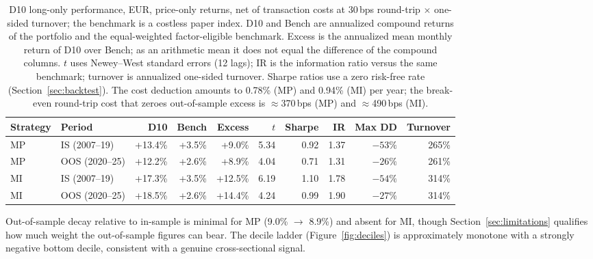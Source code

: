 \documentclass[11pt,a4paper]{article}
\begin{document}
\begin{table}[t]
\centering
\small
\setlength{\tabcolsep}{4pt}
\begin{tabular}{llrrrrrrrr}
\toprule
Strategy & Period & D10 & Bench & Excess & $t$ & Sharpe & IR & Max DD & Turnover \\
\midrule
MP & IS  (2007--19) & +13.4\% & +3.5\% & +9.0\%  & 5.34 & 0.92 & 1.37 & $-53\%$ & 265\% \\
MP & OOS (2020--25) & +12.2\% & +2.6\% & +8.9\%  & 4.04 & 0.71 & 1.31 & $-26\%$ & 261\% \\
MI & IS  (2007--19) & +17.3\% & +3.5\% & +12.5\% & 6.19 & 1.10 & 1.78 & $-54\%$ & 314\% \\
MI & OOS (2020--25) & +18.5\% & +2.6\% & +14.4\% & 4.24 & 0.99 & 1.90 & $-27\%$ & 314\% \\
\bottomrule
\end{tabular}
\caption{D10 long-only performance, EUR, price-only returns, net of
transaction costs at 30\,bps round-trip $\times$ one-sided turnover; the
benchmark is a costless paper index.
D10 and Bench are annualized compound returns of the portfolio and the
equal-weighted factor-eligible benchmark. Excess is the annualized mean
monthly return of D10 over Bench; as an arithmetic mean it does not equal
the difference of the compound columns. $t$ uses Newey--West standard
errors (12 lags); IR is the
information ratio versus the same benchmark; turnover is annualized one-sided
turnover. Sharpe ratios use a zero risk-free rate
(Section~\ref{sec:backtest}). The cost deduction amounts to 0.78\% (MP)
and 0.94\% (MI) per year; the break-even round-trip cost that zeroes
out-of-sample excess is $\approx$370\,bps (MP) and
$\approx$490\,bps (MI).}
\label{tab:headline}
\end{table}

Out-of-sample decay relative to in-sample is minimal for MP (9.0\% $\to$
8.9\%) and absent for MI, though Section~\ref{sec:limitations} qualifies
how much weight the out-of-sample figures can bear. The decile ladder
(Figure~\ref{fig:deciles}) is approximately monotone with a strongly
negative bottom decile, consistent with a genuine cross-sectional signal.
\end{document}
